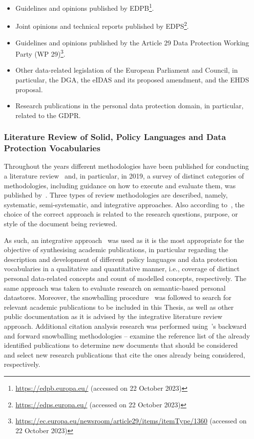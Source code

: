 \begin{itemize}
    \item Guidelines and opinions published by EDPB\footnote{\url{https://edpb.europa.eu/} (accessed on 22 October 2023)}.
    \item Joint opinions and technical reports published by EDPS\footnote{\url{https://edps.europa.eu/} (accessed on 22 October 2023)}.
    \item Guidelines and opinions published by the Article 29 Data Protection Working Party (WP 29)\footnote{\url{https://ec.europa.eu/newsroom/article29/items/itemType/1360} (accessed on 22 October 2023)}.
    \item Other data-related legislation of the European Parliament and Council, in particular, the DGA, the eIDAS and its proposed amendment, and the EHDS proposal.
    \item Research publications in the personal data protection domain, in particular, related to the GDPR.
\end{itemize}

\subsubsection{Literature Review of Solid, Policy Languages and Data Protection Vocabularies}
\label{sec:technical_review}

Throughout the years different methodologies have been published for conducting a literature review~\citep{webster_analyzing_2002, kitchenham_systematic_2013} and, in particular, in 2019, a survey of distinct categories of methodologies, including guidance on how to execute and evaluate them, was published by~\cite{snyder_literature_2019}.
Three types of review methodologies are described, namely, systematic, semi-systematic, and integrative approaches. %
Also according to~\citeauthor{snyder_literature_2019}, the choice of the correct approach is related to the research questions, purpose, or style of the document being reviewed.

As such, an integrative approach~\citep{whittemore_integrative_2005} was used as it is the most appropriate for the objective of synthesising academic publications, in particular regarding the description and development of different policy languages and data protection vocabularies in a qualitative and quantitative manner, i.e., coverage of distinct personal data-related concepts and count of modelled concepts, respectively.
The same approach was taken to evaluate research on semantic-based personal datastores.
Moreover, the snowballing procedure~\citep{wohlin_guidelines_2014} was followed to search for relevant academic publications to be included in this Thesis, as well as other public documentation as it is advised by the integrative literature review approach.
Additional citation analysis research was performed using~\citeauthor{webster_analyzing_2002}'s backward and forward snowballing methodologies -- examine the reference list of the already identified publications to determine new documents that should be considered and select new research publications that cite the ones already being considered, respectively.

